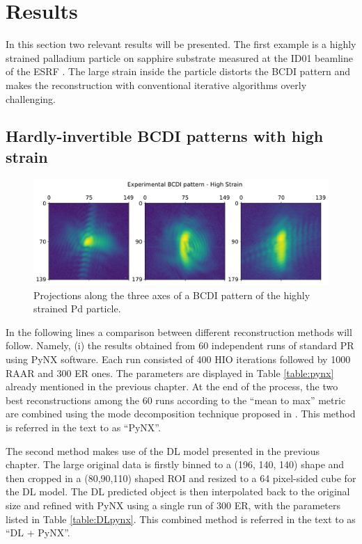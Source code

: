 \section{Results}
In this section two relevant results will be presented. The first example is a highly strained palladium particle on 
sapphire substrate measured at the ID01 beamline of the ESRF \cite{bellec2026ultrafast}. 
The large strain inside the particle distorts the BCDI pattern and makes the reconstruction with conventional iterative 
algorithms overly challenging. 

\subsection{Hardly-invertible BCDI patterns with high strain}

\begin{figure}[H]
  \centering
  \includegraphics[width=\textwidth]{figures/AD/AD_exp3_michael.pdf}
  \caption{Projections along the three axes of a BCDI pattern of the highly strained Pd particle. }
  \label{fig:projections_michael}
\end{figure}

In the following lines a comparison between different reconstruction methods will follow. Namely, (i) the results obtained 
from 60 independent runs of standard PR using PyNX software. Each run consisted of 400 HIO iterations followed by 1000 RAAR and 
300 ER ones. The parameters are displayed in Table \ref{table:pynx} already mentioned in the previous chapter. 
At the end of the process, the two best reconstructions among the 60 runs according to the ``mean to max'' metric 
are combined using the mode decomposition technique proposed in \cite{favre-nicolin_free_2020}. 
This method is referred in the text to as ``PyNX''. 
  
The second method makes use of the DL model presented in the previous chapter. The large original data is firstly 
binned to a (196, 140, 140) shape and then cropped in a (80,90,110) shaped ROI and resized to a 64 pixel-sided cube 
for the DL model. The DL predicted object is then 
interpolated back to the original size and refined with PyNX using a single run of 300 ER, with the parameters 
listed in Table \ref{table:DLpynx}. This combined method is referred in the text to as ``DL + PyNX''. 
 
